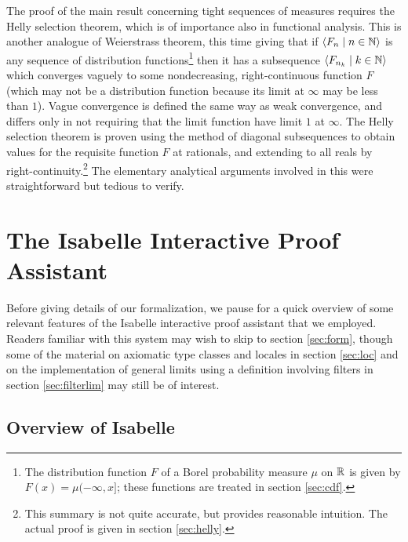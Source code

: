 \documentclass[leqno]{article}
\theoremstyle{definition}
\newcommand{\bldseq}[2]{\langle{#1}\mid{#2}\rangle}
\begin{document}
The proof of the main result concerning tight sequences of measures requires the Helly selection theorem, which is of importance also in functional analysis. This is another analogue of Weierstrass theorem, this time giving that if \linebreak $\bldseq{F_n}{n \in \N}$ is any sequence of distribution functions\footnote{The distribution function $F$ of a Borel probability measure $\mu$ on $\mathbb{R}$ is given by $F(x) = \mu(-\infty, x]$; these functions are treated in section \ref{sec:cdf}.} then it has a subsequence $\bldseq{F_{n_k}}{k \in \N}$ which converges vaguely to some nondecreasing, right-continuous function $F$ (which may not be a distribution function because its limit at $\infty$ may be less than $1$). Vague convergence is defined the same way as weak convergence, and differs only in not requiring that the limit function have limit $1$ at $\infty$. The Helly selection theorem is proven using the method of diagonal subsequences to obtain values for the requisite function $F$ at rationals, and extending to all reals by right-continuity.\footnote{This summary is not quite accurate, but provides reasonable intuition. The actual proof is given in section \ref{sec:helly}.} The elementary analytical arguments involved in this were straightforward but tedious to verify.

\section{The Isabelle Interactive Proof Assistant}

Before giving details of our formalization, we pause for a quick overview of some relevant features of the Isabelle interactive proof assistant that we employed. Readers familiar with this system may wish to skip to section \ref{sec:form}, though some of the material on axiomatic type classes and locales in section \ref{sec:loc} and on the implementation of general limits using a definition involving filters in section \ref{sec:filterlim} may still be of interest.

\subsection{Overview of Isabelle}
\end{document}
